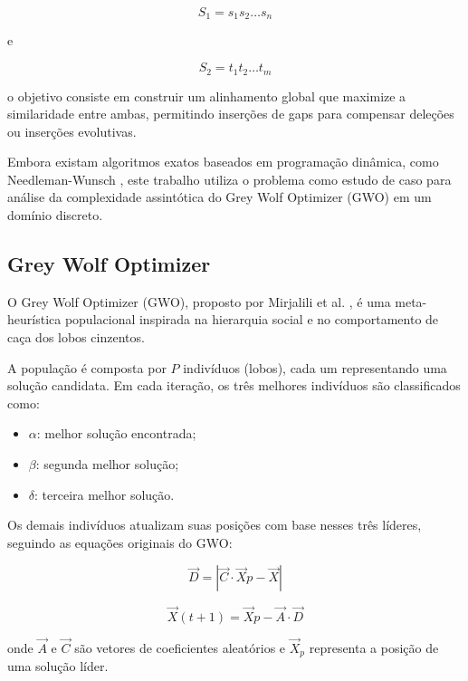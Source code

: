 \documentclass[12pt]{article}
\begin{document}
\begin{equation}
    S_1 = s_1s_2\ldots s_n
\end{equation}

e

\begin{equation}
    S_2 = t_1t_2\ldots t_m
\end{equation}

o objetivo consiste em construir um alinhamento global que maximize a similaridade entre ambas, permitindo inserções de gaps para compensar deleções ou inserções evolutivas.

Embora existam algoritmos exatos baseados em programação dinâmica, como Needleman-Wunsch \cite{needleman}, este trabalho utiliza o problema como estudo de caso para análise da complexidade assintótica do Grey Wolf Optimizer (GWO) em um domínio discreto.

\subsection{Grey Wolf Optimizer}

O Grey Wolf Optimizer (GWO), proposto por Mirjalili et al. \cite{gwo}, é uma meta-heurística populacional inspirada na hierarquia social e no comportamento de caça dos lobos cinzentos.

A população é composta por $P$ indivíduos (lobos), cada um representando uma solução candidata. Em cada iteração, os três melhores indivíduos são classificados como:

\begin{itemize}
    \item $\alpha$: melhor solução encontrada;
    \item $\beta$: segunda melhor solução;
    \item $\delta$: terceira melhor solução.
\end{itemize}

Os demais indivíduos atualizam suas posições com base nesses três líderes, seguindo as equações originais do GWO:

\begin{equation}
    \vec{D} = |\vec{C}\cdot \vec{X}{p} - \vec{X}|
\end{equation}

\begin{equation}
    \vec{X}(t+1) = \vec{X}{p} - \vec{A}\cdot \vec{D}
\end{equation}

onde $\vec{A}$ e $\vec{C}$ são vetores de coeficientes aleatórios e $\vec{X}_p$ representa a posição de uma solução líder.
\end{document}
